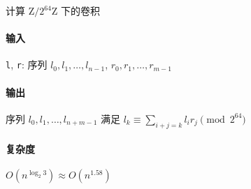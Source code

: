 计算 \(\mathrm{Z}/2^{64}\mathrm{Z}\) 下的卷积

\paragraph{输入}

\verb|l|, \verb|r|: 序列 \(l_0, l_1, \dots, l_{n-1}\), \(r_0, r_1, \dots, r_{m-1}\)

\paragraph{输出}

序列 \(l_0, l_1, \dots, l_{n+m-1}\) 满足 \(l_k\equiv \sum_{i+j=k}l_ir_j\pmod{2^{64}}\)

\paragraph{复杂度}

\(O\left(n^{\log_2 3}\right)\approx O\left(n^{1.58}\right)\)
